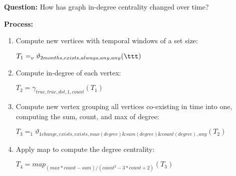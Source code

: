 
{\bf Question:} How has graph in-degree centrality changed over time?

{\bf Process:}
\begin{enumerate}[noitemsep]
\item Compute new vertices with temporal windows of a set size:

$T_1 = _v\vartheta_{2 months,exists,always,any,any}( \ttt)$

\item Compute in-degree of each vertex:

$T_2 = \gamma_{true,true,dst,1,count}(T_1)$

\item Compute new vertex grouping all vertices co-existing in time
  into one, computing the sum, count, and max of degree:

$T_3 = _1\vartheta_{1 change,exists,exists,max(degree)\&sum(degree)\&count(degree),any}(T_2)$

\item Apply map to compute the degree centrality:

$T_4 = map_{(max*count-sum)/(count^2-3*count+2)}(T_3)$

\end{enumerate}

